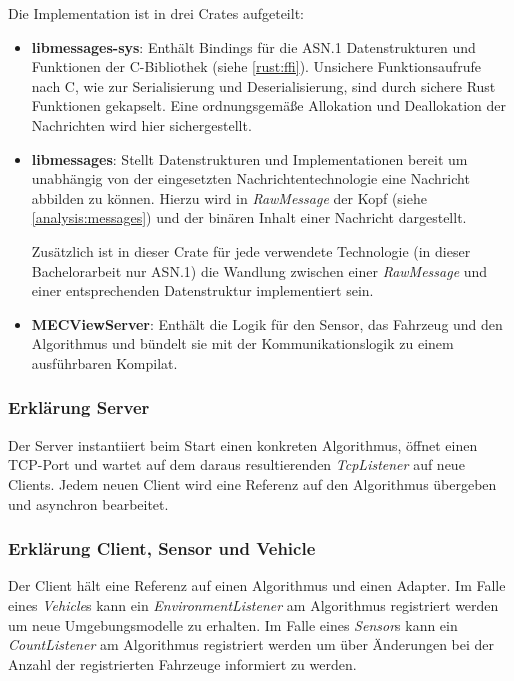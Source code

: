 

Die Implementation ist in drei Crates aufgeteilt:
\begin{itemize}
	\item \textbf{libmessages-sys}: Enthält Bindings für die ASN.1 Datenstrukturen und Funktionen der C-Bibliothek (siehe \autoref{rust:ffi}).
	Unsichere Funktionsaufrufe nach C, wie zur Serialisierung und Deserialisierung, sind durch sichere Rust Funktionen gekapselt.
	Eine ordnungsgemäße Allokation und Deallokation der Nachrichten wird hier sichergestellt.
	
	\item \textbf{libmessages}: Stellt Datenstrukturen und Implementationen bereit um unabhängig von der eingesetzten Nachrichtentechnologie eine Nachricht abbilden zu können.
	Hierzu wird in \textit{RawMessage} der Kopf (siehe \autoref{analysis:messages}) und der binären Inhalt einer Nachricht dargestellt.
	
	Zusätzlich ist in dieser Crate für jede verwendete Technologie (in dieser Bachelorarbeit nur ASN.1) die Wandlung zwischen einer \textit{RawMessage} und einer entsprechenden Datenstruktur implementiert sein.
	
	\item \textbf{MECViewServer}: Enthält die Logik für den Sensor, das Fahrzeug und den Algorithmus und bündelt sie mit der Kommunikationslogik zu einem ausführbaren Kompilat.
\end{itemize}

\subsubsection{Erklärung Server}

Der Server instantiiert beim Start einen konkreten Algorithmus, öffnet einen TCP-Port und wartet auf dem daraus resultierenden \textit{TcpListener} auf neue Clients.
Jedem neuen Client wird eine Referenz auf den Algorithmus übergeben und asynchron bearbeitet.

\subsubsection{Erklärung Client, Sensor und Vehicle}

Der Client hält eine Referenz auf einen Algorithmus und einen Adapter.
Im Falle eines \textit{Vehicle}s kann ein \textit{EnvironmentListener} am Algorithmus registriert werden um neue Umgebungsmodelle zu erhalten.
Im Falle eines \textit{Sensor}s kann ein \textit{CountListener} am Algorithmus registriert werden um über Änderungen bei der Anzahl der registrierten Fahrzeuge informiert zu werden.

